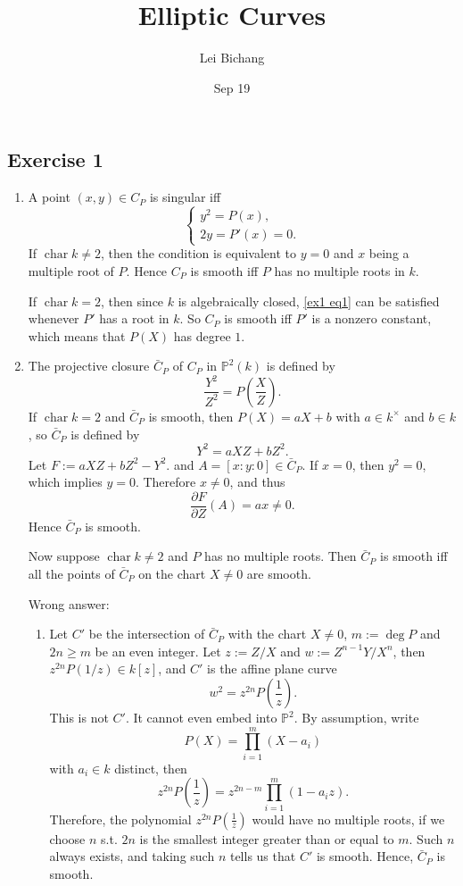 \documentclass{article}
\title{Elliptic Curves}
\author{Lei Bichang}
\date{Sep 19}
\theoremstyle{definition}
\theoremstyle{remark}
\renewcommand{\P}{\mathbb{P}}
\DeclareMathOperator{\cha}{char} %
\newcommand{\pdfrac}[2]{\dfrac{\partial #1}{\partial #2}} %
\begin{document}
\maketitle


\subsection*{Exercise 1}
\begin{enumerate}
\item A point $(x, y)\in C_P$ is singular iff \begin{equation}\label{ex1 eq1}
    \begin{cases}
        y^2 = P(x),\\
        2y = P'(x) = 0.
    \end{cases}
\end{equation}
If $\cha k\ne 2$, then the condition is equivalent to $y = 0$ and $x$ being a multiple root of $P$.
Hence $C_P$ is smooth iff $P$ has no multiple roots in $k$.

If $\cha k = 2$, then since $k$ is algebraically closed, \cref{ex1 eq1} can be satisfied whenever $P'$ has a root in $k$.
So $C_P$ is smooth iff $P'$ is a nonzero constant, which means that $P(X)$ has degree $1$.

\item The projective closure $\bar{C}_P$ of $C_P$ in $\P^2(k)$ is defined by \begin{equation*}
    \frac{Y^2}{Z^2} = P\left( \frac{X}{Z} \right).
\end{equation*}
If $\cha k = 2$ and $\bar{C}_P$ is smooth, then $P(X) = aX + b$ with $a\in k^\times$ and $b\in k$, so $\bar{C}_P$ is defined by \[Y^2 = aXZ + bZ^2.\]
Let $F := aXZ + bZ^2 - Y^2$.
and $A = [x : y : 0]\in\bar{C}_P$. If $x = 0$, then $y^2 = 0$, which implies $y = 0$. Therefore $x\ne 0$, and thus \[\pdfrac{F}{Z}(A) = ax \ne 0.\] Hence $\bar{C}_P$ is smooth.

Now suppose $\cha k\ne 2$ and $P$ has no multiple roots. Then $\bar{C}_P$ is smooth iff all the points of $\bar{C}_P$ on the chart $X \ne 0$ are smooth.

Wrong answer:
\begin{enumerate}
    \item [] Let $C'$ be the intersection of $\bar{C}_P$ with the chart $X\ne 0$, $m := \deg P$ and $2n \ge m$ be an even integer.
    Let $z:=Z/X$ and $w:= Z^{n-1}Y/X^n$,
    then $z^{2n}P(1/z)\in k[z]$, and $C'$ is the affine plane curve\[w^2= z^{2n}P\left( \frac{1}{z} \right).\]
    {\color{red}This is not $C'$. It cannot even embed into $\P^2$.}
    By assumption, write \[P(X) = \prod_{i=1}^m (X-a_i)\]with $a_i\in k$ distinct, then \[z^{2n}P\left( \frac{1}{z} \right) = z^{2n-m}\prod_{i=1}^m(1-a_iz).\]
    Therefore, the polynomial $z^{2n}P\left( \frac{1}{z} \right)$ would have no multiple roots, if we choose $n$ s.t. $2n$ is the smallest integer greater than or equal to $m$. Such $n$ always exists, and taking such $n$ tells us that $C'$ is smooth. Hence, $\bar{C}_P$ is smooth.
    

\end{enumerate}
\end{enumerate}
\end{document}
